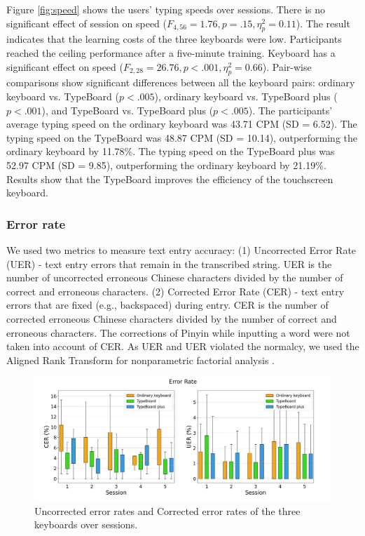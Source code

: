 Figure \ref{fig:speed} shows the users' typing speeds over sessions. There is no significant effect of session on speed ($F_{4,56}=1.76,p=.15,\eta_p^2=0.11$). The result indicates that the learning costs of the three keyboards were low. Participants reached the ceiling performance after a five-minute training. Keyboard has a significant effect on speed ($F_{2,28}=26.76,p<.001,\eta_p^2=0.66$). Pair-wise comparisons show significant differences between all the keyboard pairs: ordinary keyboard vs. TypeBoard ($p<.005$), ordinary keyboard vs. TypeBoard plus ($p<.001$), and TypeBoard vs. TypeBoard plus ($p<.005$). The participants' average typing speed on the ordinary keyboard was 43.71 CPM (SD = 6.52). The typing speed on the TypeBoard was 48.87 CPM (SD = 10.14), outperforming the ordinary keyboard by 11.78\%. The typing speed on the TypeBoard plus was 52.97 CPM (SD = 9.85), outperforming the ordinary keyboard by 21.19\%. Results show that the TypeBoard improves the efficiency of the touchscreen keyboard.

\subsubsection{Error rate}

We used two metrics to measure text entry accuracy: (1) Uncorrected Error Rate (UER) - text entry errors that remain in the transcribed string. UER is the number of uncorrected erroneous Chinese characters divided by the number of correct and erroneous characters. (2) Corrected Error Rate (CER) - text entry errors that are fixed (e.g., backspaced) during entry. CER is the number of corrected erroneous Chinese characters divided by the number of correct and erroneous characters. The corrections of Pinyin while inputting a word were not taken into account of CER. As UER and UER violated the normalcy, we used the Aligned Rank Transform for nonparametric factorial analysis \cite{2011-Aligned}.

\begin{figure}[!tbh]
	\includegraphics[width=1.0\linewidth]{figures/error_rate.png}
	\centering
	\caption{Uncorrected error rates and Corrected error rates of the three keyboards over sessions.}
	\label{fig:error_rate}
\end{figure}

